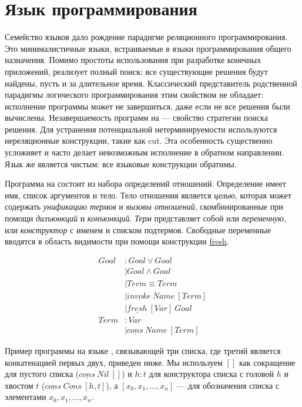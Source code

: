 \documentclass[conference,american,russian]{IEEEtran}
\begin{document}
\section{Язык программирования \miniKanren{}}\label{miniKanren}

Семейство языков \miniKanren{} дало рождение парадигме реляционного программирования. 
Это минималистичные языки, встраиваемые в языки программирования общего назначения. 
Помимо простоты использования при разработке конечных приложений, \miniKanren{} реализует полный поиск: все существующие решения будут найдены, пусть и за длительное время.
Классический представитель родственной парадигмы логического программирования \prolog{} этим свойством не обладает: исполнение программы может не завершиться, даже если не все решения были вычислены. 
Незавершаемость программ на \prolog{} --- свойство стратегии поиска решения.
Для устранения потенциальной нетерминируемости используются нереляционные конструкции, такие как cut. 
Эта особенность существенно усложняет и часто делает невозможным исполнение в обратном направлении. 
Язык \miniKanren{} же является чистым: все языковые конструкции обратимы. 

Программа на \miniKanren{} состоит из набора определений отношений. 
Определение имеет имя, список аргументов и тело.
Тело отношения является \textit{целью}, которая может содержать \textit{унификацию термов} и \textit{вызовы отношений}, скомбинированные при помощи \textit{дизъюнкций} и \textit{конъюнкций}. 
\textit{Терм} представляет собой или \textit{переменную}, или \textit{конструктор} с именем и списком подтермов. 
Свободные переменные вводятся в область видимости при помощи конструкции \underline{fresh}. 

\begin{align*}
  Goal &: Goal \vee Goal \\
       &\mid Goal \wedge Goal \\
       &\mid Term \equiv Term \\
       &\mid \underline{invoke} \ Name \ [Term] \\
       &\mid \underline{fresh} \ [Var] \ Goal \\
  Term &: Var \\ 
       &\mid \underline{cons} \ Name \ [Term]
\end{align*}

Пример программы на языке \miniKanren{}, связывающей три списка, где третий является конкатенацией первых двух, приведен ниже. Мы используем $[]$ как сокращение для пустого списка ($\underline{cons} \ Nil \ []$) и $h : t$ для конструктора списка с головой $h$ и хвостом $t$ ($\underline{cons} \ Cons \ [h, t]$), а $[x_0, x_1, \dots, x_n]$ --- для обозначения списка с элементами $x_0, x_1, \dots, x_n$.
\end{document}
